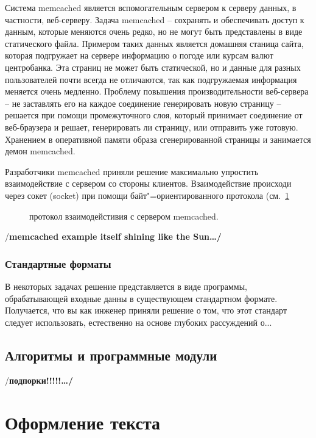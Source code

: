 \documentclass[a4paper,14pt,final]{extreport}
\newcommand{\aaa}[1]{{/\bfseries #1\ldots/}}
\begin{document}
Система memcached является вспомогательным сервером к серверу данных, в частности, веб-серверу.  Задача memcached -- сохранять и обеспечивать доступ к данным, которые меняются очень редко, но не могут быть представлены в виде статического файла.  Примером таких данных является домашняя станица сайта, которая подгружает на сервере информацию о погоде или курсам валют центробанка.  Эта страниц не может быть статической, но и данные для разных пользователей почти всегда не отличаются, так как подгружаемая информация меняется очень медленно.  Проблему повышения производительности веб-сервера -- не заставлять его на каждое соединение генерировать новую страницу -- решается при помощи промежуточного слоя, который принимает соединение от веб-браузера и решает, генерировать ли страницу, или отправить уже готовую.  Хранением в оперативной памяти образа сгенерированной страницы и занимается демон memcached.

Разработчики memcached приняли решение максимально упростить взаимодействие с сервером со стороны клиентов.  Взаимодействие происходи через сокет (socket) при помощи байт"=ориентированного протокола (см.~\ref{fig:memcached}
\begin{figure}[hbt]
  \centering

  \caption[Протокол memcached]{протокол взаимодейстивия с сервером memcached.}
  \label{fig:memcached}
\end{figure}

\aaa{memcached example itself shining like the Sun}


\subsection{Стандартные форматы}
\label{sec:standardformats}

В некоторых задачах решение представляется в виде программы, обрабатывающей входные данны в существующем стандартном формате.  Получается, что вы как инженер приняли решение о том, что этот стандарт следует использовать, естественно на основе глубоких рассуждений о...

\section{Алгоритмы и программные модули}
\label{sec:programmod}



\aaa{подпорки!!!!!}

\chapter{Оформление текста}
\label{cha:layout}
\end{document}
